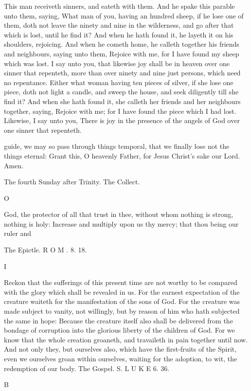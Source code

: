 This man receiveth sinners, and eateth with them. And he spake this parable unto them, saying, What man of you, having an hundred sheep, if he lose one of them, doth not leave the ninety and nine in the wilderness, and go after that which is lost, until he find it? And when he hath found it, he layeth it on his shoulders, rejoicing. And when he cometh home, he calleth together his friends and neighbours, saying unto them, Rejoice with me, for I have found my sheep which was lost. I say unto you, that likewise joy shall be in heaven over one sinner that repenteth, more than over ninety and nine just persons, which need no repentance. Either what woman having ten pieces of silver, if she lose one piece, doth not light a candle, and sweep the house, and seek diligently till she find it? And when she hath found it, she calleth her friends and her neighbours together, saying, Rejoice with me; for I have found the piece which I had lost. Likewise, I say unto you, There is joy in the presence of the angels of God over one sinner that repenteth.

guide, we may so pass through things temporal, that we finally lose not the things eternal: Grant this, O heavenly Father, for Jesus Christ’s sake our Lord. Amen.

The fourth Sunday after Trinity. The Collect.

O

God, the protector of all that trust in thee, without whom nothing is strong, nothing is holy: Increase and multiply upon us thy mercy; that thou being our ruler and

The Epictle. R O M . 8. 18.

I

Reckon that the sufferings of this present time are not worthy to be compared with the glory which shall be revealed in us. For the earnest expectation of the creature waiteth for the manifestation of the sons of God. For the creature was made subject to vanity, not willingly, but by reason of him who hath subjected the same in hope: Because the creature itself also shall be delivered from the bondage of corruption into the glorious liberty of the children of God. For we know that the whole creation groaneth, and travaileth in pain together until now. And not only they, but ourselves also, which have the first-fruits of the Spirit, even we ourselves groan within ourselves, waiting for the adoption, to wit, the redemption of our body. The Gospel. S. L U K E 6. 36.

B

